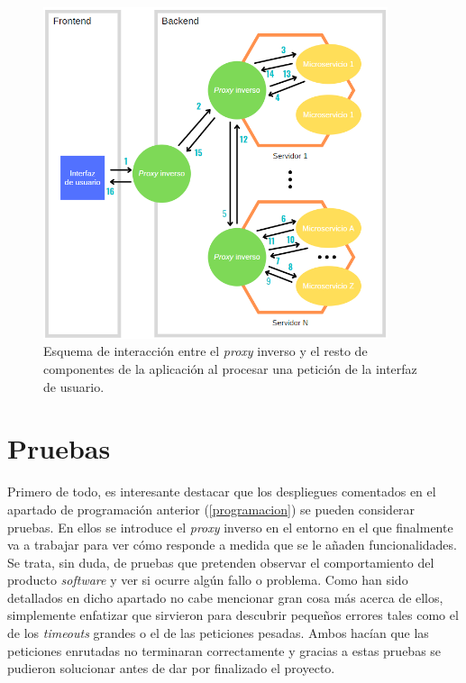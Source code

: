 \documentclass[11pt,spanish,listoffigures]{tfgetsinf}
\begin{document}
\begin{figure}[ht]
\centering
\includegraphics[width=0.9\textwidth]{imagenes/esquemaInteraccionProxyInverso}
\caption{Esquema de interacción entre el \emph{proxy} inverso y el resto de componentes de la aplicación al procesar una petición de la interfaz de usuario.}
	\label{esquemaInteraccionProxyInverso}
\end{figure}


	\section{Pruebas} \label{pruebas}

Primero de todo, es interesante destacar que los despliegues comentados en el apartado de programación anterior (\ref{programacion}) se pueden considerar pruebas. En ellos se introduce el \emph{proxy} inverso en el entorno en el que finalmente va a trabajar para ver cómo responde a medida que se le añaden funcionalidades. Se trata, sin duda, de pruebas que pretenden observar el comportamiento del producto \emph{software} y ver si ocurre algún fallo o problema. Como han sido detallados en dicho apartado no cabe mencionar gran cosa más acerca de ellos, simplemente enfatizar que sirvieron para descubrir pequeños errores tales como el de los \emph{timeouts} grandes o el de las peticiones pesadas. Ambos hacían que las peticiones enrutadas no terminaran correctamente y gracias a estas pruebas se pudieron solucionar antes de dar por finalizado el proyecto.
\end{document}

